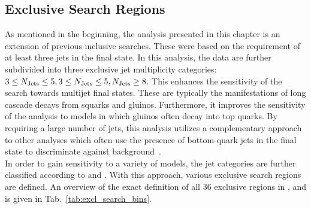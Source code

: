 \subsection{Exclusive Search Regions}
\label{subsec:RA2_search_regions}
As mentioned in the beginning, the analysis presented in this chapter is an extension of previous inclusive searches. These were based on the requirement of at least three jets in the final state. In this analysis, the data are further subdivided into three exclusive jet multiplicity categories: $3 \leq N_{\text{Jets}} \leq 5, 3 \leq N_{\text{Jets}} \leq 5, N_{\text{Jets}} \ge 8$. This enhances the sensitivity of the search towards multijet final states. These are typically the manifestations of long cascade decays from squarks and gluinos. Furthermore, it improves the sensitivity of the analysis to models in which gluinos often decay into top quarks. By requiring a large number of jets, this analysis utilizes a complementary approach to other analyses which often use the presence of bottom-quark jets in the final state to discriminate against background~\cite{Chatrchyan:2013lya, Chatrchyan:2013wxa, CMS-PAS-SUS-13-019, CMS-PAS-SUS-14-011}. \\
In order to gain sensitivity to a variety of models, the jet categories are further classified according to \HT and \MHT. With this approach, various exclusive search regions are defined. An overview of the exact definition of all 36 exclusive regions in \NJets, \HT and \MHT is given in Tab.~\ref{tab:excl_search_bins}.
